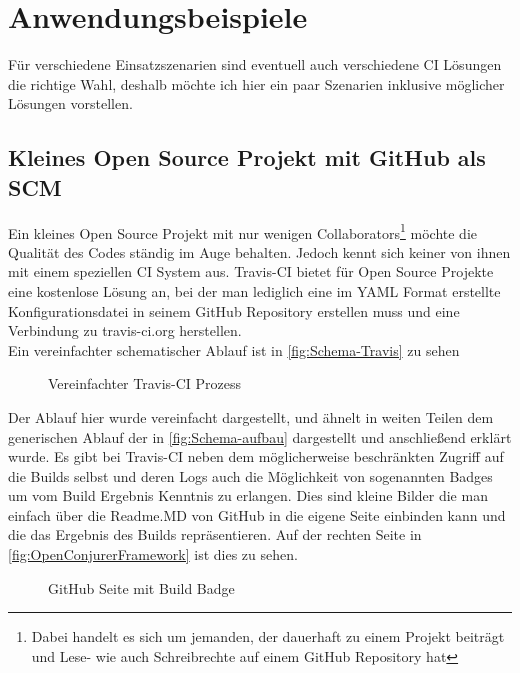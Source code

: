 \pagebreak

\chapter{Anwendungsbeispiele}
Für verschiedene Einsatzszenarien sind eventuell auch verschiedene CI Lösungen die richtige Wahl, deshalb möchte ich hier ein paar Szenarien inklusive möglicher Lösungen vorstellen.
\section{Kleines Open Source Projekt mit GitHub als SCM}
Ein kleines Open Source Projekt mit nur wenigen Collaborators\footnote{Dabei handelt es sich um jemanden, der dauerhaft zu einem Projekt beiträgt und Lese- wie auch Schreibrechte auf einem GitHub Repository hat} möchte die Qualität des Codes ständig im Auge behalten. Jedoch kennt sich keiner von ihnen mit einem speziellen CI System aus. Travis-CI bietet für Open Source Projekte eine kostenlose Lösung an, bei der man lediglich eine im YAML Format erstellte Konfigurationsdatei in seinem GitHub Repository erstellen muss und eine Verbindung zu travis-ci.org herstellen.\\
Ein vereinfachter schematischer Ablauf ist in \autoref{fig:Schema-Travis} zu sehen
\begin{figure}[H]
  \centering
  \caption{Vereinfachter Travis-CI Prozess}\label{fig:Schema-Travis}
\end{figure}
Der Ablauf hier wurde vereinfacht dargestellt, und ähnelt in weiten Teilen dem generischen Ablauf der in \autoref{fig:Schema-aufbau} dargestellt und anschließend erklärt wurde. Es gibt bei Travis-CI neben dem möglicherweise beschränkten Zugriff auf die Builds selbst und deren Logs auch die Möglichkeit von sogenannten Badges um vom Build Ergebnis Kenntnis zu erlangen. Dies sind kleine Bilder die man einfach über die Readme.MD von GitHub in die eigene Seite einbinden kann und die das Ergebnis des Builds repräsentieren. Auf der rechten Seite in \autoref{fig:OpenConjurerFramework} ist dies zu sehen.
\begin{figure}[H]
  \centering
  \caption{GitHub Seite mit Build Badge}\label{fig:OpenConjurerFramework}
\end{figure}

